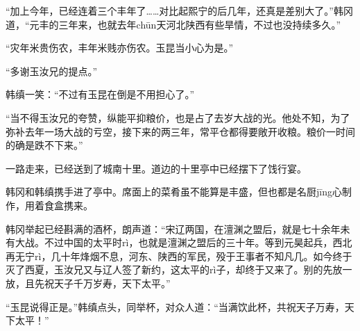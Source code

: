 “加上今年，已经连着三个丰年了……对比起熙宁的后几年，还真是差别大了。”韩冈道，“元丰的三年来，也就去年chūn天河北陕西有些旱情，不过也没持续多久。”

“灾年米贵伤农，丰年米贱亦伤农。玉昆当小心为是。”

“多谢玉汝兄的提点。”

韩缜一笑：“不过有玉昆在倒是不用担心了。”

“当不得玉汝兄的夸赞，纵能平抑粮价，也是占了去岁大战的光。他处不知，为了弥补去年一场大战的亏空，接下来的两三年，常平仓都得要敞开收粮。粮价一时间的确是跌不下来。”

一路走来，已经送到了城南十里。道边的十里亭中已经摆下了饯行宴。

韩冈和韩缜携手进了亭中。席面上的菜肴虽不能算是丰盛，但也都是名厨jīng心制作，用着食盒携来。

韩冈举起已经斟满的酒杯，朗声道：“宋辽两国，在澶渊之盟后，就是七十余年未有大战。不过中国的太平时rì，也就是澶渊之盟后的三十年。等到元昊起兵，西北再无宁rì，几十年烽烟不息，河东、陕西的军民，殁于王事者不知凡几。如今终于灭了西夏，玉汝兄又与辽人签了新约，这太平的rì子，却终于又来了。别的先放一放，且先祝天子千万岁寿，天下太平。”

“玉昆说得正是。”韩缜点头，同举杯，对众人道：“当满饮此杯，共祝天子万寿，天下太平！”

